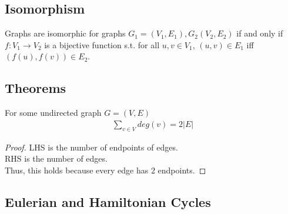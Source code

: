 \documentclass[a4paper]{article}
\theoremstyle{plain}
\newtheorem{thm}{Theorem}[section]
\theoremstyle{definition}
\theoremstyle{remark}
\begin{document}
\subsection{Isomorphism}
Graphs are isomorphic for graphs $G_1=(V_1,E_1), G_2(V_2,E_2)$ if and only if $f:V_1 \to V_2$ is a bijective function s.t. for all $u,v \in V_1$, $(u,v) \in E_1$ iff $(f(u),f(v)) \in E_2$. 
\subsection{Theorems} 
\begin{tcolorbox}[colback=black!3!white,colframe=black!60!white,title=\begin{thm}Handshaking Theorem \label{Handshaking Theorem}\end{thm}] 
For some undirected graph $G=(V,E)$ 
\begin{align} 
	\sum_{v \in V}deg(v) = 2 |E|
\end{align}
\begin{proof}
	LHS is the number of endpoints of edges.  \\
	RHS is the number of edges. \\
	Thus, this holds because every edge has $2$ endpoints.
\end{proof}
\end{tcolorbox}
\subsection{Eulerian and Hamiltonian Cycles}
\end{document}
